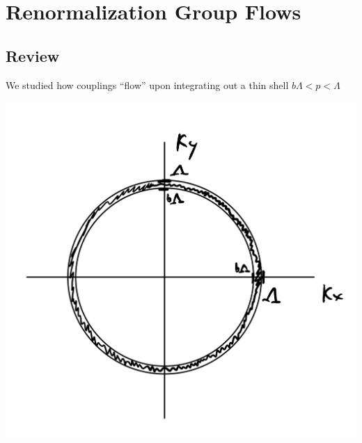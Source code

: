 \section{Renormalization Group Flows}
\subsection{Review}
We studied how couplings ``flow'' upon integrating out a thin shell $b\Lambda < p < \Lambda$

\begin{center}
    \includegraphics[scale=0.35]{Lectures/Figures/lec14-momentumshell.png}
\end{center}

